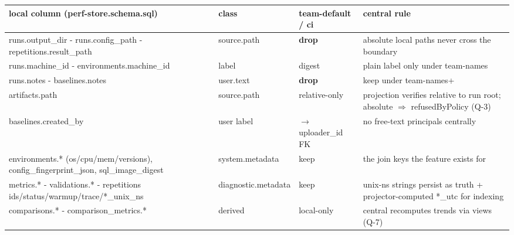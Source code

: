 \documentclass[10pt]{article}
\begin{document}
\begin{adjustbox}{max width=\linewidth,max height=0.82\textheight,center}
\begin{minipage}{272mm}

\begin{tabular}{p{62mm}p{28mm}p{40mm}p{120mm}}
\toprule
\textbf{local column (perf-store.schema.sql)} & \textbf{class} & \textbf{team-default / ci} & \textbf{central rule} \\
\midrule
runs.output\_dir - runs.config\_path - repetitions.result\_path & source.path & \cellcolor{risk}\textbf{drop} & absolute local paths never cross the boundary \\
runs.machine\_id - environments.machine\_id & label & \cellcolor{policy}digest & plain label only under team-names \\
runs.notes - baselines.notes & user.text & \cellcolor{risk}\textbf{drop} & keep under team-names+ \\
artifacts.path & source.path & \cellcolor{policy}relative-only & projection verifies relative to run root; absolute $\Rightarrow$ refusedByPolicy (Q-3) \\
baselines.created\_by & user label & \cellcolor{policy}$\to$ uploader\_id FK & no free-text principals centrally \\
environments.* (os/cpu/mem/versions), config\_fingerprint\_json, sql\_image\_digest & system.metadata & \cellcolor{good}keep & the join keys the feature exists for \\
metrics.* - validations.* - repetitions ids/status/warmup/trace/*\_unix\_ns & diagnostic.metadata & \cellcolor{good}keep & unix-ns strings persist as truth + projector-computed *\_utc for indexing \\
comparisons.* - comparison\_metrics.* & derived & \cellcolor{external}local-only & central recomputes trends via views (Q-7) \\
\bottomrule
\end{tabular}


\end{minipage}
\end{adjustbox}
\end{document}
